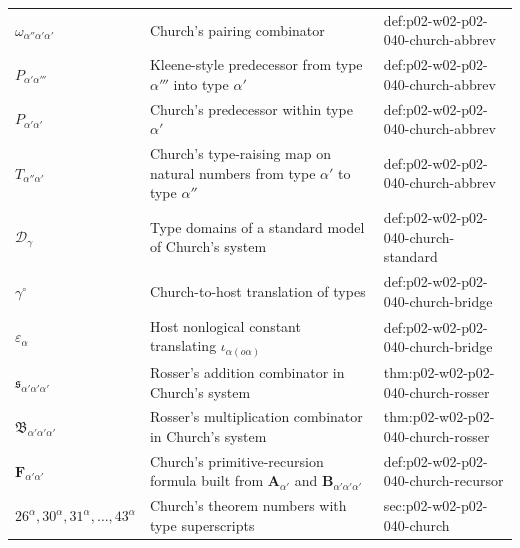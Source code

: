 \begin{longtable}{@{}p{}p{}p{}@{}}
\(\omega_{\alpha''\alpha'\alpha'}\) & Church's pairing combinator & def:\allowbreak{}p02-\allowbreak{}w02-\allowbreak{}p02-\allowbreak{}040-\allowbreak{}church-\allowbreak{}abbrev \\
\(P_{\alpha'\alpha'''}\) & Kleene-style predecessor from type \(\alpha'''\) into type \(\alpha'\) & def:\allowbreak{}p02-\allowbreak{}w02-\allowbreak{}p02-\allowbreak{}040-\allowbreak{}church-\allowbreak{}abbrev \\
\(P_{\alpha'\alpha'}\) & Church's predecessor within type \(\alpha'\) & def:\allowbreak{}p02-\allowbreak{}w02-\allowbreak{}p02-\allowbreak{}040-\allowbreak{}church-\allowbreak{}abbrev \\
\(T_{\alpha''\alpha'}\) & Church's type-raising map on natural numbers from type \(\alpha'\) to type \(\alpha''\) & def:\allowbreak{}p02-\allowbreak{}w02-\allowbreak{}p02-\allowbreak{}040-\allowbreak{}church-\allowbreak{}abbrev \\
\(\mathcal D_\gamma\) & Type domains of a standard model of Church's system & def:\allowbreak{}p02-\allowbreak{}w02-\allowbreak{}p02-\allowbreak{}040-\allowbreak{}church-\allowbreak{}standard \\
\(\gamma^\circ\) & Church-to-host translation of types & def:\allowbreak{}p02-\allowbreak{}w02-\allowbreak{}p02-\allowbreak{}040-\allowbreak{}church-\allowbreak{}bridge \\
\(\varepsilon_\alpha\) & Host nonlogical constant translating \(\iota_{\alpha(o\alpha)}\) & def:\allowbreak{}p02-\allowbreak{}w02-\allowbreak{}p02-\allowbreak{}040-\allowbreak{}church-\allowbreak{}bridge \\
\(\mathfrak s_{\alpha'\alpha'\alpha'}\) & Rosser's addition combinator in Church's system & thm:\allowbreak{}p02-\allowbreak{}w02-\allowbreak{}p02-\allowbreak{}040-\allowbreak{}church-\allowbreak{}rosser \\
\(\mathfrak B_{\alpha'\alpha'\alpha'}\) & Rosser's multiplication combinator in Church's system & thm:\allowbreak{}p02-\allowbreak{}w02-\allowbreak{}p02-\allowbreak{}040-\allowbreak{}church-\allowbreak{}rosser \\
\(\mathbf F_{\alpha'\alpha'}\) & Church's primitive-recursion formula built from \(\mathbf A_{\alpha'}\) and \(\mathbf B_{\alpha'\alpha'\alpha'}\) & def:\allowbreak{}p02-\allowbreak{}w02-\allowbreak{}p02-\allowbreak{}040-\allowbreak{}church-\allowbreak{}recursor \\
\(26^\alpha,\allowbreak 30^\alpha,\allowbreak 31^\alpha,\allowbreak \ldots,\allowbreak 43^\alpha\) & Church's theorem numbers with type superscripts & sec:\allowbreak{}p02-\allowbreak{}w02-\allowbreak{}p02-\allowbreak{}040-\allowbreak{}church \\

\end{longtable}
